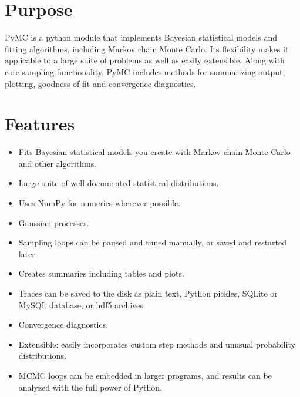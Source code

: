 





\hypertarget{purpose}{}
\section{Purpose}
\label{purpose}

PyMC is a python module that implements Bayesian statistical models and
fitting algorithms, including Markov chain Monte Carlo.
Its flexibility makes it applicable to a large suite of problems as well as
easily extensible. Along with core sampling functionality, PyMC includes
methods for summarizing output, plotting, goodness-of-fit and convergence
diagnostics.



\hypertarget{features}{}
\section{Features}
\label{features}
\begin{itemize}
\item {}
Fits Bayesian statistical models you create with Markov chain Monte Carlo and
other algorithms.

\item {}
Large suite of well-documented statistical distributions.

\item {}
Uses NumPy for numerics wherever possible.

\item {}
Gaussian processes.

\item {}
Sampling loops can be paused and tuned manually, or saved and restarted later.

\item {}
Creates summaries including tables and plots.

\item {}
Traces can be saved to the disk as plain text, Python pickles, SQLite or MySQL
database, or hdf5 archives.

\item {}
Convergence diagnostics.

\item {}
Extensible: easily incorporates custom step methods and unusual probability
distributions.

\item {}
MCMC loops can be embedded in larger programs, and results can be analyzed
with the full power of Python.

\end{itemize}


